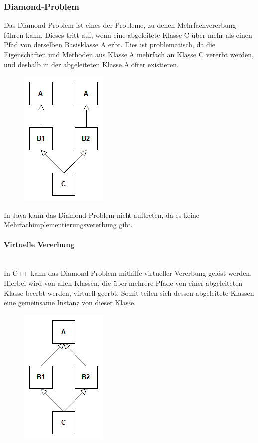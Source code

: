 		\subsubsection{Diamond-Problem}
			Das Diamond-Problem ist eines der Probleme, zu denen Mehrfachvererbung führen kann. Dieses tritt auf, wenn eine
			abgeleitete Klasse C über mehr als einen Pfad von derselben Basisklasse A erbt. Dies ist problematisch, da die
			Eigenschaften und Methoden aus Klasse A mehrfach an Klasse C vererbt werden, und deshalb in der abgeleiteten Klasse
			A öfter existieren.
			\begin{figure}[H]
				\includegraphics[scale=0.75]{vererbung/mehrfach/diamond/nicht_virtuell.png}
			\end{figure}
			
			In Java kann das Diamond-Problem nicht auftreten, da es keine Mehrfachimplementierungsvererbung gibt.
			
			\paragraph{Virtuelle Vererbung}\mbox{}\\
				In C++ kann das  Diamond-Problem mithilfe virtueller Vererbung gelöst werden. Hierbei wird von allen Klassen, die über
				mehrere Pfade von einer abgeleiteten Klasse beerbt werden, virtuell geerbt. Somit teilen sich dessen
				abgeleitete Klassen eine gemeinsame Instanz von dieser Klasse.
				\begin{figure}[H]
					\includegraphics[scale=0.75]{vererbung/mehrfach/diamond/virtuell.png}
				\end{figure}
				
